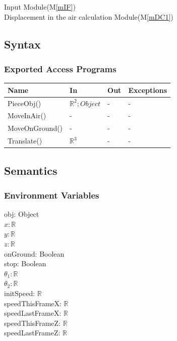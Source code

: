 \documentclass[12pt, titlepage]{article}
\newcommand{\mref}[1]{M\ref{#1}}
\begin{document}
Input Module(\mref{mIF})\\
Displacement in the air calculation Module(\mref{mDC1})\\

\subsection{Syntax}

\subsubsection{Exported Access Programs}

\begin{center}
	\begin{tabular}{p{4cm} p{4cm} p{4cm} p{2cm}}
		\hline
		\textbf{Name} & \textbf{In} & \textbf{Out} & \textbf{Exceptions} \\
		\hline		
		PieceObj() & $\mathbb{R}^{2};Object$ & - & - \\
		MoveInAir() & - & - & - \\
		MoveOnGround() & - & - & - \\
		Translate() & $\mathbb{R}^{3}$ & - & - \\
		\hline
	\end{tabular}
\end{center}

\subsection{Semantics}

\subsubsection{Environment Variables}

obj: Object\\
$x: \mathbb{R}$\\
$y: \mathbb{R}$\\
$z: \mathbb{R}$\\
onGround: Boolean\\
stop: Boolean\\
$\theta_{1}: \mathbb{R}$\\
$\theta_{2}: \mathbb{R}$\\
initSpeed: $\mathbb{R}$\\
speedThisFrameX: $\mathbb{R}$\\
speedLastFrameX: $\mathbb{R}$\\
speedThisFrameZ: $\mathbb{R}$\\
speedLastFrameZ: $\mathbb{R}$
\end{document}
